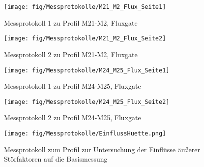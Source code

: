 \begin{figure}[!ht]
 \centering
 \texttt{[image: fig/Messprotokolle/M21\_M2\_Flux\_Seite1]}
 \caption{Messprotokoll 1 zu Profil M21-M2, Fluxgate}
\end{figure}

\begin{figure}[!ht]
 \centering
 \texttt{[image: fig/Messprotokolle/M21\_M2\_Flux\_Seite2]}
 \caption{Messprotokoll 2 zu Profil M21-M2, Fluxgate}
\end{figure}

\begin{figure}[!ht]
 \centering
 \texttt{[image: fig/Messprotokolle/M24\_M25\_Flux\_Seite1]}
 \caption{Messprotokoll 1 zu Profil M24-M25, Fluxgate}
\end{figure}

\begin{figure}[!ht]
 \centering
 \texttt{[image: fig/Messprotokolle/M24\_M25\_Flux\_Seite2]}
 \caption{Messprotokoll 2 zu Profil M24-M25, Fluxgate}
 \label{fig:MPProfil_letztes}
\end{figure}

\begin{figure}[!ht]
 \centering
 \texttt{[image: fig/Messprotokolle/EinflussHuette.png]}
 \caption{Messprotokoll zum Profil zur Untersuchung der Einflüsse äußerer Störfaktoren auf die Basismessung}
 \label{fig:MPHuette}
\end{figure}


% 

